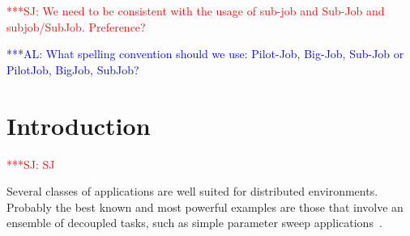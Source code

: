 \documentclass[conference,final]{IEEEtran}
\newcommand{\up}{\vspace*{-1em}}
\newcommand{\alnote}[1]{ {\textcolor{blue} { ***AL: #1 }}}
\newcommand{\jhanote}[1]{ {\textcolor{red} { ***SJ: #1 }}}
\newcommand{\alnote}[1]{}
\newcommand{\jhanote}[1]{}
\begin{document}











\jhanote{We need to be consistent with the usage of sub-job and
  Sub-Job and subjob/SubJob. Preference?}

\alnote{What spelling convention should we use: Pilot-Job, Big-Job, Sub-Job or PilotJob, BigJob, SubJob?}

\section{Introduction} \jhanote{SJ}

Several classes of applications are well suited for distributed
environments. Probably the best known and most powerful examples are
those that involve an ensemble of decoupled tasks, such as simple
parameter sweep applications~\cite{1239909}.
\end{document}
